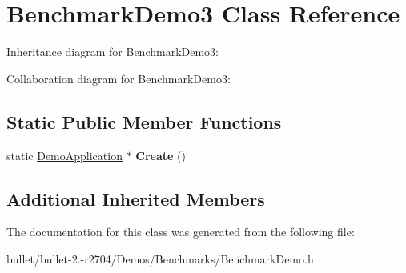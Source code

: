 \hypertarget{class_benchmark_demo3}{\section{Benchmark\+Demo3 Class Reference}
\label{class_benchmark_demo3}
}


Inheritance diagram for Benchmark\+Demo3\+:


Collaboration diagram for Benchmark\+Demo3\+:
\subsection*{Static Public Member Functions}
\begin{DoxyCompactItemize}
\item 
\hypertarget{class_benchmark_demo3_a58062c44fa507e4ca029eb52a05786f0}{static \hyperlink{class_demo_application}{Demo\+Application} $\ast$ {\bfseries Create} ()}\label{class_benchmark_demo3_a58062c44fa507e4ca029eb52a05786f0}

\end{DoxyCompactItemize}
\subsection*{Additional Inherited Members}


The documentation for this class was generated from the following file\+:\begin{DoxyCompactItemize}
\item 
bullet/bullet-\/2.-\/r2704/\+Demos/\+Benchmarks/Benchmark\+Demo.\+h\end{DoxyCompactItemize}
